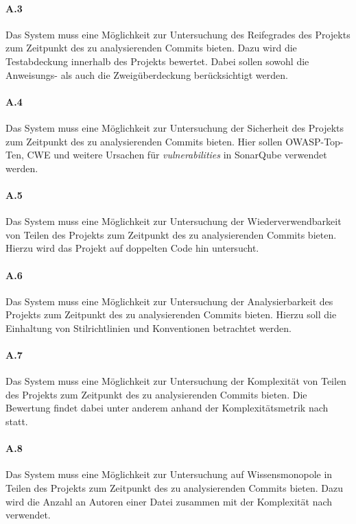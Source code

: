 \documentclass[
	oneside,  %
	ngerman, 
	final, 
	11pt, 
	a4paper, 
	1.1headlines, 
	headinclude=false, 
	footinclude=false, 
	mpinclude=false, 
	pagesize, 
	onecolumn, 
	titlepage, 
	parskip=half, 
	headsepline, 
	chapterprefix=false, 
	version=first, 
	listof=totoc, 
	bibliography=totoc, 
	toc=graduated, 
	fleqn
]{scrbook}
\begin{document}
\paragraph{A.3}
Das System muss eine Möglichkeit zur Untersuchung des Reifegrades des Projekts zum Zeitpunkt des zu analysierenden Commits bieten.
Dazu wird die Testabdeckung innerhalb des Projekts bewertet. Dabei sollen sowohl die Anweisungs- als auch die Zweigüberdeckung berücksichtigt werden.

\paragraph{A.4}
Das System muss eine Möglichkeit zur Untersuchung der Sicherheit des Projekts zum Zeitpunkt des zu analysierenden Commits bieten.
Hier sollen \acs{OWASP}-Top-Ten, \acs{CWE} und weitere Ursachen für \textit{vulnerabilities} in SonarQube verwendet werden.

\paragraph{A.5}
Das System muss eine Möglichkeit zur Untersuchung der Wiederverwendbarkeit von Teilen des Projekts zum Zeitpunkt des zu analysierenden Commits bieten.
Hierzu wird das Projekt auf doppelten Code hin untersucht.

\paragraph{A.6}
Das System muss eine Möglichkeit zur Untersuchung der Analysierbarkeit des Projekts zum Zeitpunkt des zu analysierenden Commits bieten.
Hierzu soll die Einhaltung von Stilrichtlinien und Konventionen betrachtet werden.

\paragraph{A.7}
Das System muss eine Möglichkeit zur Untersuchung der Komplexität von Teilen des Projekts zum Zeitpunkt des zu analysierenden Commits bieten.
Die Bewertung findet dabei unter anderem anhand der Komplexitätsmetrik nach \cite{MC1976} statt.

\paragraph{A.8}
Das System muss eine Möglichkeit zur Untersuchung auf Wissensmonopole in Teilen des Projekts zum Zeitpunkt des zu analysierenden Commits bieten.
Dazu wird die Anzahl an Autoren einer Datei zusammen mit der Komplexität nach \cite{MC1976} verwendet.
\end{document}
